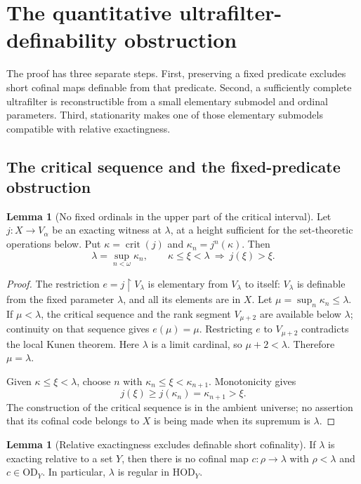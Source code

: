 \documentclass[11pt,letterpaper]{article}
\theoremstyle{definition}
\newtheorem{lemma}[definition]{Lemma}
\newcommand{\HOD}{\mathrm{HOD}}
\newcommand{\OD}{\mathrm{OD}}
\newcommand{\crit}{\operatorname{crit}}
\newcommand{\restr}{\mathbin{\upharpoonright}}
\theoremstyle{remark}
\begin{document}
\section{The quantitative ultrafilter-definability obstruction}\label{sec:regular}

The proof has three separate steps. First, preserving a fixed predicate excludes short cofinal maps definable from that predicate. Second, a sufficiently complete ultrafilter is reconstructible from a small elementary submodel and ordinal parameters. Third, stationarity makes one of those elementary submodels compatible with relative exactingness.

\subsection{The critical sequence and the fixed-predicate obstruction}

\begin{lemma}[No fixed ordinals in the upper part of the critical interval]\label{lem:moved}
Let $j:X\to V_\alpha$ be an exacting witness at $\lambda$, at a height sufficient for the set-theoretic operations below. Put $\kappa=\crit(j)$ and $\kappa_n=j^n(\kappa)$. Then
\[
 \lambda=\sup_{n<\omega}\kappa_n,
 \qquad
 \kappa\leq\xi<\lambda\ \Longrightarrow\ j(\xi)>\xi.
\]
\end{lemma}

\begin{proof}
The restriction $e=j\restr V_\lambda$ is elementary from $V_\lambda$ to itself: $V_\lambda$ is definable from the fixed parameter $\lambda$, and all its elements are in $X$. Let $\mu=\sup_n\kappa_n\leq\lambda$. If $\mu<\lambda$, the critical sequence and the rank segment $V_{\mu+2}$ are available below $\lambda$; continuity on that sequence gives $e(\mu)=\mu$. Restricting $e$ to $V_{\mu+2}$ contradicts the local Kunen theorem. Here $\lambda$ is a limit cardinal, so $\mu+2<\lambda$. Therefore $\mu=\lambda$.

Given $\kappa\leq\xi<\lambda$, choose $n$ with
$\kappa_n\leq\xi<\kappa_{n+1}$. Monotonicity gives
\[
 j(\xi)\geq j(\kappa_n)=\kappa_{n+1}>\xi.
\]
The construction of the critical sequence is in the ambient universe; no assertion that its cofinal code belongs to $X$ is being made when its supremum is $\lambda$.
\end{proof}

\begin{lemma}[Relative exactingness excludes definable short cofinality]\label{lem:relative-regular}
If $\lambda$ is exacting relative to a set $Y$, then there is no cofinal map $c:\rho\to\lambda$ with $\rho<\lambda$ and $c\in\OD_Y$. In particular, $\lambda$ is regular in $\HOD_Y$.
\end{lemma}
\end{document}
